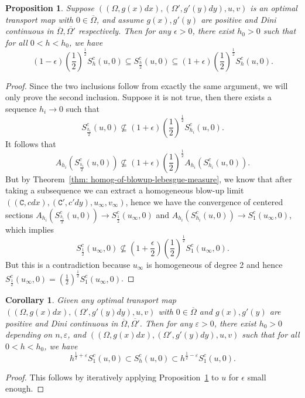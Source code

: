 \documentclass[12pt,reqno]{amsart}
\newtheorem{prop}{Proposition}[section]
\newtheorem{corr}{Corollary}[section]
\newcommand{\eps}{\varepsilon}
\numberwithin{equation}{section}
\begin{document}
    
	\begin{prop}\label{prop: C-1-alpha bound on sections}
			Suppose $((\Omega, g(x)dx), (\Omega', g'(y)dy), u, v)$ is an optimal transport map with $0\in \overline{\Omega}$, and assume $g(x), g'(y)$ are positive and Dini continuous in $\overline{\Omega}, \overline{\Omega'}$ respectively. Then for any $\epsilon>0$, there exist $h_0>0$ such that for all $0<h<h_0$, we have
			\[(1-\epsilon)(\frac{1}{2})^{\frac{1}{2}}S^c_h(u, 0)\subseteq S^c_\frac{h}{2}(u, 0)\subseteq (1+\epsilon)(\frac{1}{2})^{\frac{1}{2}}S^c_h(u, 0).\]	\end{prop}
	\begin{proof}
		Since the two inclusions follow from exactly the same argument, we will only prove the second inclusion. Suppose it is not true, then there exists a sequence $h_i\to 0$ such that 
			\[S^c_\frac{h_i}{2}(u, 0)\nsubseteq (1+\epsilon)(\frac{1}{2})^{\frac{1}{2}}S^c_{h_i}(u, 0).\]
	It follows that 
			\[A_{h_i}(S^c_\frac{h_i}{2}( u, 0))\nsubseteq (1+\epsilon)(\frac{1}{2})^{\frac{1}{2}}A_{h_i}(S^c_{h_i}( u, 0)).\]
            But by Theorem~\ref{thm: homog-of-blowup-lebesgue-measure}, we know that after taking a subsequence we can extract a homogeneous blow-up limit $((\mathtt C, cdx), (\mathtt C', c'dy), u_{\infty}, v_{\infty})$, hence we have the convergence of centered sections $A_{h_i}(S^c_\frac{h_i}{2}(u, 0))\to S_{\frac 1 2}^c( u_{\infty}, 0)$ and $A_{h_i}(S^c_{h_i}( u, 0))\to S_1^c(u_{\infty}, 0)$, which implies
            \[S_{\frac 1 2}^c( u_{\infty}, 0) \nsubseteq (1+\frac{\epsilon}{2})(\frac 1 2)^{\frac 1 2}S_1^c( u_{\infty}, 0).\]
            But this is a contradiction because $u_{\infty}$ is homogeneous of degree 2 and hence $S_{\frac 1 2}^c(u_{\infty}, 0) = (\frac 1 2)^{\frac 1 2}S_1^c(u_{\infty}, 0)$. 
	\end{proof}

        \begin{corr}\label{corr: pointwise-C-1-alpha-estimate}
            Given any optimal transport map $((\Omega, g(x)dx), (\Omega', g'(y)dy), u, v)$ with $0\in \overline{\Omega}$ and $g(x), g'(y)$ are positive and Dini continuous in $\overline{\Omega}, \overline{\Omega'}$. Then for any $\eps>0$, there exist $h_0>0$ depending on $n, \eps$, and $((\Omega, g(x)dx), (\Omega', g'(y)dy), u, v)$ such that for all $0<h<h_0$, we have
            \[h^{\frac 1 2+\eps}S_1^c(u, 0)\subset S^c_h(u, 0)\subset h^{\frac 1 2-\eps}S_1^c(u, 0).\]
        \end{corr}
        \begin{proof}
            This follows by iteratively applying Proposition~\ref{prop: C-1-alpha bound on sections} to $u$ for $\epsilon$ small enough. 
        \end{proof}
\end{document}

